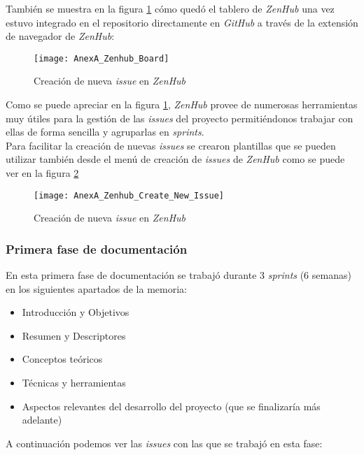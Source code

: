 También se muestra en la figura \ref{fig:AnexA_Zenhub_Board} cómo quedó el tablero de \textit{ZenHub} una vez estuvo integrado en el repositorio directamente en \textit{GitHub} a través de la extensión de navegador de \textit{ZenHub}:

\begin{figure}[!h]
	\centering
	\texttt{[image: AnexA\_Zenhub\_Board]}
	\caption{Creación de nueva \textit{issue} en \textit{ZenHub}}
	\label{fig:AnexA_Zenhub_Board}
\end{figure}
\FloatBarrier

Como se puede apreciar en la figura \ref{fig:AnexA_Zenhub_Board}, \textit{ZenHub} provee de numerosas herramientas muy útiles para la gestión de las \textit{issues} del proyecto permitiéndonos trabajar con ellas de forma sencilla y agruparlas en \textit{sprints}.\\
Para facilitar la creación de nuevas \textit{issues} se crearon plantillas que se pueden utilizar también desde el menú de creación de \textit{issues} de \textit{ZenHub} como se puede ver en la figura \ref{fig:AnexA_Zenhub_Create_New_Issue}

\begin{figure}[!h]
	\centering
	\texttt{[image: AnexA\_Zenhub\_Create\_New\_Issue]}
	\caption{Creación de nueva \textit{issue} en \textit{ZenHub}}
	\label{fig:AnexA_Zenhub_Create_New_Issue}
\end{figure}
\FloatBarrier

\subsubsection{Primera fase de documentación}

En esta primera fase de documentación se trabajó durante 3 \textit{sprints} (6 semanas) en los siguientes apartados de la memoria:

\begin{itemize}
	\item Introducción y Objetivos
	\item Resumen y Descriptores
	\item Conceptos teóricos
	\item Técnicas y herramientas
	\item Aspectos relevantes del desarrollo del proyecto (que se finalizaría más adelante)
\end{itemize}

A continuación podemos ver las \textit{issues} con las que se trabajó en esta fase:

